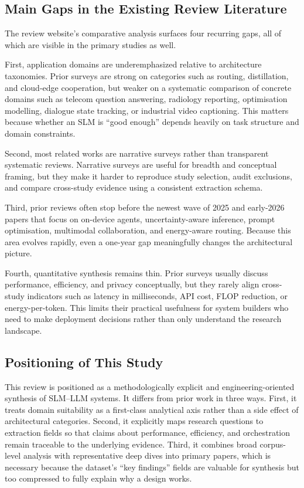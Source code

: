\subsection{Main Gaps in the Existing Review Literature}
The review website's comparative analysis surfaces four recurring gaps, all of which are visible in the primary studies as well.

First, application domains are underemphasized relative to architecture taxonomies. Prior surveys are strong on categories such as routing, distillation, and cloud-edge cooperation, but weaker on a systematic comparison of concrete domains such as telecom question answering, radiology reporting, optimisation modelling, dialogue state tracking, or industrial video captioning. This matters because whether an SLM is ``good enough'' depends heavily on task structure and domain constraints.

Second, most related works are narrative surveys rather than transparent systematic reviews. Narrative surveys are useful for breadth and conceptual framing, but they make it harder to reproduce study selection, audit exclusions, and compare cross-study evidence using a consistent extraction schema.

Third, prior reviews often stop before the newest wave of 2025 and early-2026 papers that focus on on-device agents, uncertainty-aware inference, prompt optimisation, multimodal collaboration, and energy-aware routing. Because this area evolves rapidly, even a one-year gap meaningfully changes the architectural picture.

Fourth, quantitative synthesis remains thin. Prior surveys usually discuss performance, efficiency, and privacy conceptually, but they rarely align cross-study indicators such as latency in milliseconds, API cost, FLOP reduction, or energy-per-token. This limits their practical usefulness for system builders who need to make deployment decisions rather than only understand the research landscape.

\subsection{Positioning of This Study}
This review is positioned as a methodologically explicit and engineering-oriented synthesis of SLM--LLM systems. It differs from prior work in three ways. First, it treats domain suitability as a first-class analytical axis rather than a side effect of architectural categories. Second, it explicitly maps research questions to extraction fields so that claims about performance, efficiency, and orchestration remain traceable to the underlying evidence. Third, it combines broad corpus-level analysis with representative deep dives into primary papers, which is necessary because the dataset's ``key findings'' fields are valuable for synthesis but too compressed to fully explain why a design works.

